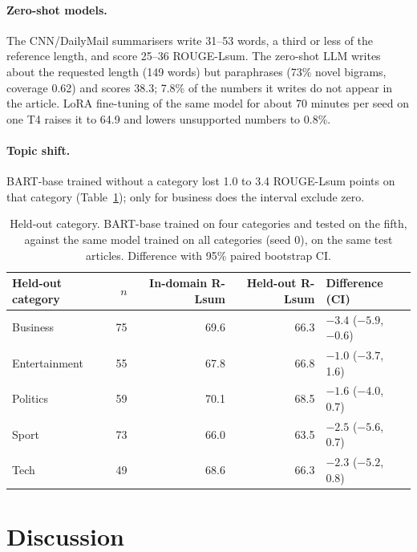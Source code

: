 \documentclass[11pt,a4paper]{article}
\begin{document}
\paragraph{Zero-shot models.} The CNN/DailyMail summarisers write 31--53 words, a third or less of the reference length, and score 25--36 ROUGE-Lsum. The zero-shot LLM writes about the requested length (149 words) but paraphrases (73\% novel bigrams, coverage 0.62) and scores 38.3; 7.8\% of the numbers it writes do not appear in the article. LoRA fine-tuning of the same model for about 70 minutes per seed on one T4 raises it to 64.9 and lowers unsupported numbers to 0.8\%.

\paragraph{Topic shift.} BART-base trained without a category lost 1.0 to 3.4 ROUGE-Lsum points on that category (Table~\ref{tab:xcat}); only for business does the interval exclude zero.

\begin{table}[t]
\centering\small
\caption{Held-out category. BART-base trained on four categories and tested on the fifth, against the same model trained on all categories (seed 0), on the same test articles. Difference with 95\% paired bootstrap CI.}
\label{tab:xcat}
\begin{tabular}{lrrrl}
\toprule
Held-out category & $n$ & In-domain R-Lsum & Held-out R-Lsum & Difference (CI)\\
\midrule
Business & 75 & 69.6 & 66.3 & $-3.4$ ($-5.9$, $-0.6$)\\
Entertainment & 55 & 67.8 & 66.8 & $-1.0$ ($-3.7$, 1.6)\\
Politics & 59 & 70.1 & 68.5 & $-1.6$ ($-4.0$, 0.7)\\
Sport & 73 & 66.0 & 63.5 & $-2.5$ ($-5.6$, 0.7)\\
Tech & 49 & 68.6 & 66.3 & $-2.3$ ($-5.2$, 0.8)\\
\bottomrule
\end{tabular}
\end{table}

\section{Discussion}\label{sec:discussion}
\end{document}
